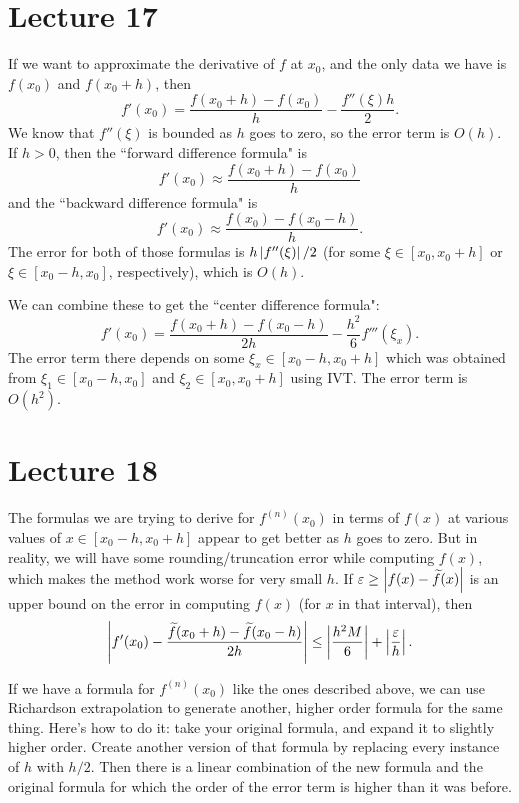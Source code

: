\documentclass{article}
\begin{document}
\section{Lecture 17}
If we want to approximate the derivative of $f$ at $x_0$, and the only data we have is $f(x_0)$ and $f(x_0+h)$, then
\[ f'(x_0) = \frac{f(x_0+h) - f(x_0)}{h} - \frac{f''(\xi)h}{2}. \]
We know that $f''(\xi)$ is bounded as $h$ goes to zero, so the error term is $O(h)$. If $h > 0$, then the ``forward difference formula" is
\[ f'(x_0) \approx \frac{f(x_0+h)-f(x_0)}{h} \]
and the ``backward difference formula" is
\[ f'(x_0) \approx \frac{f(x_0)-f(x_0-h)}{h}. \]
The error for both of those formulas is $h \left\lvert f''(\xi) \right\rvert/2$ (for some $\xi \in [x_0, x_0+h]$ or $\xi \in [x_0-h, x_0]$, respectively), which is $O(h)$.
\par
We can combine these to get the ``center difference formula":
\[ f'(x_0) = \frac{f(x_0+h)-f(x_0-h)}{2h} - \frac{h^2}{6} f'''(\xi_x). \]
The error term there depends on some $\xi_x \in [x_0-h,x_0+h]$ which was obtained from $\xi_1 \in [x_0-h,x_0]$ and $\xi_2 \in [x_0, x_0+h]$ using IVT. The error term is $O(h^2)$.

\section{Lecture 18}
The formulas we are trying to derive for $f^{(n)}(x_0)$ in terms of $f(x)$ at various values of $x \in [x_0 - h, x_0 + h]$ appear to get better as $h$ goes to zero. But in reality, we will have some rounding/truncation error while computing $f(x)$, which makes the method work worse for very small $h$. If $\varepsilon \geq \left\lvert f(x)-\widetilde{f}(x) \right\rvert$ is an upper bound on the error in computing $f(x)$ (for $x$ in that interval), then
\[ \left\lvert f'(x_0) - \frac{\widetilde{f}(x_0+h)-\widetilde{f}(x_0-h)}{2h} \right\rvert \leq \left\lvert  \frac{h^2M}{6} \right\rvert + \left\lvert  \frac{\varepsilon}{h}  \right\rvert. \]
\par
If we have a formula for $f^{(n)}(x_0)$ like the ones described above, we can use Richardson extrapolation to generate another, higher order formula for the same thing. Here's how to do it: take your original formula, and expand it to slightly higher order. Create another version of that formula by replacing every instance of $h$ with $h/2$. Then there is a linear combination of the new formula and the original formula for which the order of the error term is higher than it was before.
\end{document}
